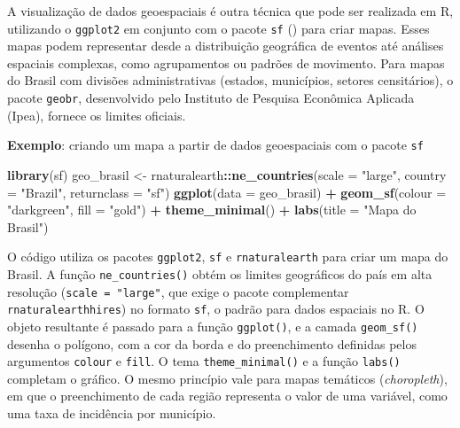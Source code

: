 \documentclass[
]{book}
\newenvironment{Shaded}{\begin{snugshade}}{\end{snugshade}}
\newcommand{\AttributeTok}[1]{\textcolor[rgb]{0.13,0.29,0.53}{#1}}
\newcommand{\FunctionTok}[1]{\textcolor[rgb]{0.13,0.29,0.53}{\textbf{#1}}}
\newcommand{\NormalTok}[1]{#1}
\newcommand{\OtherTok}[1]{\textcolor[rgb]{0.56,0.35,0.01}{#1}}
\newcommand{\SpecialCharTok}[1]{\textcolor[rgb]{0.81,0.36,0.00}{\textbf{#1}}}
\newcommand{\StringTok}[1]{\textcolor[rgb]{0.31,0.60,0.02}{#1}}
\begin{document}
A visualização de dados geoespaciais é outra técnica que pode ser realizada em R, utilizando o \texttt{ggplot2} em conjunto com o pacote \texttt{sf} () para criar mapas. Esses mapas podem representar desde a distribuição geográfica de eventos até análises espaciais complexas, como agrupamentos ou padrões de movimento. Para mapas do Brasil com divisões administrativas (estados, municípios, setores censitários), o pacote \texttt{geobr}, desenvolvido pelo Instituto de Pesquisa Econômica Aplicada (Ipea), fornece os limites oficiais.

\textbf{Exemplo}: criando um mapa a partir de dados geoespaciais com o pacote \texttt{sf}

\begin{Shaded}
\begin{Highlighting}[]
\FunctionTok{library}\NormalTok{(sf)}
\NormalTok{geo\_brasil }\OtherTok{\textless{}{-}}\NormalTok{ rnaturalearth}\SpecialCharTok{::}\FunctionTok{ne\_countries}\NormalTok{(}\AttributeTok{scale =} \StringTok{"large"}\NormalTok{, }\AttributeTok{country =} \StringTok{"Brazil"}\NormalTok{,}
                                          \AttributeTok{returnclass =} \StringTok{"sf"}\NormalTok{)}
\FunctionTok{ggplot}\NormalTok{(}\AttributeTok{data =}\NormalTok{ geo\_brasil) }\SpecialCharTok{+}
  \FunctionTok{geom\_sf}\NormalTok{(}\AttributeTok{colour =} \StringTok{"darkgreen"}\NormalTok{, }\AttributeTok{fill =} \StringTok{"gold"}\NormalTok{) }\SpecialCharTok{+}
  \FunctionTok{theme\_minimal}\NormalTok{() }\SpecialCharTok{+}
  \FunctionTok{labs}\NormalTok{(}\AttributeTok{title =} \StringTok{"Mapa do Brasil"}\NormalTok{)}
\end{Highlighting}
\end{Shaded}

O código utiliza os pacotes \texttt{ggplot2}, \texttt{sf} e \texttt{rnaturalearth} para criar um mapa do Brasil. A função \texttt{ne\_countries()} obtém os limites geográficos do país em alta resolução (\texttt{scale\ =\ "large"}, que exige o pacote complementar \texttt{rnaturalearthhires}) no formato \texttt{sf}, o padrão para dados espaciais no R. O objeto resultante é passado para a função \texttt{ggplot()}, e a camada \texttt{geom\_sf()} desenha o polígono, com a cor da borda e do preenchimento definidas pelos argumentos \texttt{colour} e \texttt{fill}. O tema \texttt{theme\_minimal()} e a função \texttt{labs()} completam o gráfico. O mesmo princípio vale para mapas temáticos (\emph{choropleth}), em que o preenchimento de cada região representa o valor de uma variável, como uma taxa de incidência por município.
\end{document}
